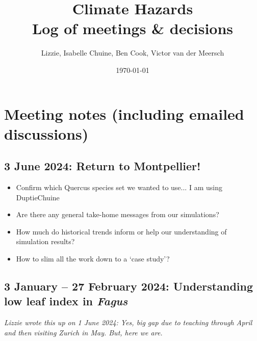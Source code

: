 \documentclass[11pt,letter]{article}
\begin{document}

\renewcommand{\refname}{\CHead{}}

\title{Climate Hazards \\ Log of meetings \& decisions}
\author{Lizzie, Isabelle Chuine, Ben Cook, Victor van der Meersch}
\date{\today}
\maketitle
\tableofcontents

\setlength{\parindent}{0pt}
\setlength{\parskip}{3pt}

\section{Meeting notes (including emailed discussions)}

\subsection{3 June 2024: Return to Montpellier!}

\begin{itemize}
\item Confirm which Quercus species set we wanted to use... I am using DuptieChuine
\item Are there any general take-home messages from our simulations?
\item How much do historical trends inform or help our understanding of simulation results?
\item How to slim all the work down to a `case study'? 
\end{itemize}


\subsection{3 January -- 27 February 2024: Understanding low leaf index in \emph{Fagus}}
\emph{Lizzie wrote this up on 1 June 2024: Yes, big gap due to teaching through April and then visiting Zurich in May. But, here we are.}\\
\end{document}
